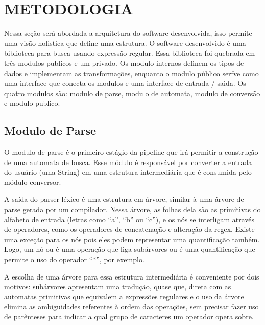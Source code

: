 \section{METODOLOGIA}


Nessa seção será abordada a arquitetura do software desenvolvida, isso permite uma visão holistica que define uma estrutura.
O software desenvolvido é uma biblioteca para busca usando expressão regular.
Essa biblioteca foi quebrada em três modulos publicos e um privado.
Os modulo internos definem os tipos de dados e implementam as transformações, enquanto o modulo público serfve como uma interface que conecta os modulos e uma interface de entrada / saida.
Os quatro modulos são: modulo de parse, modulo de automata, modulo de conversão e modulo publico.

\subsection{Modulo de Parse}

O modulo de parse é o primeiro estágio da pipeline que irá permitir a construção de uma automata de busca.
Esse módulo é responsável por converter a entrada do usuário (uma String) em uma estrutura intermediária que é consumida pelo módulo conversor.

A saída do parser léxico é uma estrutura em árvore, similar à uma árvore de parse gerada por um compilador.
Nessa árvore, as folhas dela são as primitivas do alfabeto de entrada (letras como “a”, “b” ou “c”), e os nós se interligam através de operadores, como os operadores de concatenação e alteração da regex.
Existe uma exceção para os nós pois eles podem representar uma quantificação também.
Logo, um nó ou é uma operação que liga subárvores ou é uma quantificação que permite o uso do operador “*”, por exemplo.

A escolha de uma árvore para essa estrutura intermediária é conveniente por dois motivos: subárvores apresentam uma tradução, quase que, direta com as automatas primitivas que equivalem a expressões regulares e o uso da árvore elimina as ambiguidades referentes à ordem das operações, sem precisar fazer uso de parênteses para indicar a qual grupo de caracteres um operador opera sobre.

